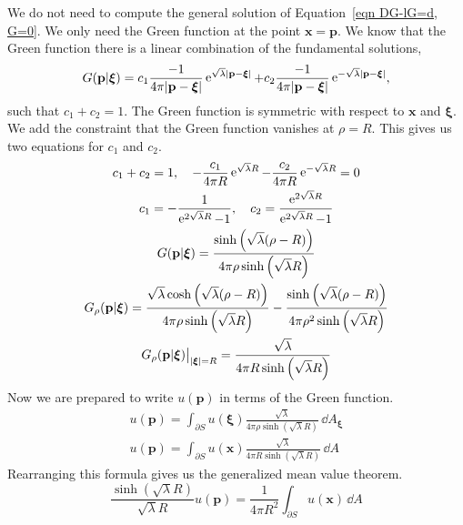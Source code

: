 {\begin{Solution}
We do not need to compute the general solution of 
Equation~\ref{eqn DG-lG=d, G=0}.  We only need the Green function at the 
point $\mathbf{x} = \mathbf{p}$.  We know that the Green function there is a 
linear combination of the fundamental solutions,
\[
G(\mathbf{p}|\boldsymbol{\xi}) = c_1 \frac{-1}{4 \pi |\mathbf{p} - \boldsymbol{\xi}|} 
\mathop{\mathrm{e}}\nolimits^{\sqrt{\lambda} |\mathbf{p} - \boldsymbol{\xi}|}
+ c_2 \frac{-1}{4 \pi |\mathbf{p} - \boldsymbol{\xi}|} 
\mathop{\mathrm{e}}\nolimits^{-\sqrt{\lambda} |\mathbf{p} - \boldsymbol{\xi}|},
\]
such that $c_1 + c_2 = 1$.  The Green function is symmetric with respect to 
$\mathbf{x}$ and $\boldsymbol{\xi}$.  We add the constraint that the 
Green function vanishes at $\rho = R$.  This gives us two equations for 
$c_1$ and $c_2$.
\begin{gather*}
  c_1 + c_2 = 1, \quad 
  - \frac{c_1}{4 \pi R} \mathop{\mathrm{e}}\nolimits^{\sqrt{\lambda} R} - \frac{c_2}{4 \pi R} \mathop{\mathrm{e}}\nolimits^{-\sqrt{\lambda} R} = 0
  \\
  c_1 = - \frac{1}{ \mathop{\mathrm{e}}\nolimits^{2 \sqrt{\lambda} R} - 1 }, \quad
  c_2 = \frac{ \mathop{\mathrm{e}}\nolimits^{ 2 \sqrt{\lambda} R } }{ \mathop{\mathrm{e}}\nolimits^{2 \sqrt{\lambda} R} - 1 }
  \\
  G(\mathbf{p}|\boldsymbol{\xi}) 
  = \frac{ \sinh \left( \sqrt{\lambda} (\rho - R) \right) }
  { 4 \pi \rho \sinh \left( \sqrt{\lambda} R \right) }
  \\
  G_\rho(\mathbf{p}|\boldsymbol{\xi}) 
  = \frac{ \sqrt{\lambda} \cosh \left( \sqrt{\lambda} (\rho - R) \right) }
  { 4 \pi \rho \sinh \left( \sqrt{\lambda} R \right) }
  - \frac{ \sinh \left( \sqrt{\lambda} (\rho - R) \right) }
  { 4 \pi \rho^2 \sinh \left( \sqrt{\lambda} R \right) }
  \\
  G_\rho(\mathbf{p}|\boldsymbol{\xi}) \big|_{|\boldsymbol{\xi}| = R}
  = \frac{ \sqrt{\lambda} }{ 4 \pi R \sinh \left( \sqrt{\lambda} R \right) }
\end{gather*}
Now we are prepared to write $u(\mathbf{p})$ in terms of the Green function.
\begin{gather*}
  u(\mathbf{p}) = \int_{\partial S} u(\boldsymbol{\xi}) 
  \frac{ \sqrt{\lambda} }{ 4 \pi \rho \sinh \left( \sqrt{\lambda} R \right) } \,\dd A_{\boldsymbol{\xi}}
  \\
  u(\mathbf{p}) = \int_{\partial S} u(\mathbf{x}) 
  \frac{ \sqrt{\lambda} }{ 4 \pi R \sinh \left( \sqrt{\lambda} R \right) } \,\dd A
\end{gather*}
Rearranging this formula gives us the generalized mean value theorem.
\[
\frac{ \sinh \left( \sqrt{\lambda} R \right) }{ \sqrt{\lambda} R } u(\mathbf{p}) 
= \frac{1}{4 \pi R^2} \int_{\partial S} u(\mathbf{x}) \,\dd A
\]
\end{Solution}








}
